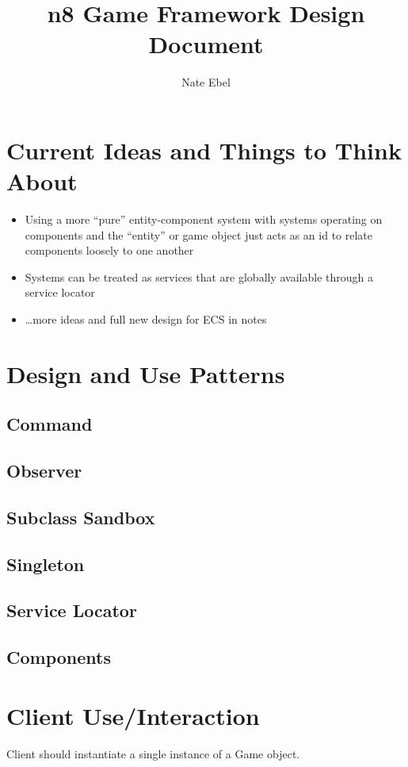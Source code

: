 \documentclass[12pt]{article}
\begin{document}
\title{n8 Game Framework Design Document}
\author{Nate Ebel}

\maketitle

\tableofcontents
\pagebreak

\section{Current Ideas and Things to Think About}
\begin{itemize}
	\item Using a more ``pure'' entity-component system with systems operating on components and the ``entity'' or game object just acts as an id to relate components loosely to one another
	\item Systems can be treated as services that are globally available through a service locator
	\item \dots more ideas and full new design for ECS in notes
\end{itemize}

\section{Design and Use Patterns}
\subsection{Command}
\subsection{Observer}
\subsection{Subclass Sandbox}
\subsection{Singleton}
\subsection{Service Locator}
\subsection{Components}

\section{Client Use/Interaction}
Client should instantiate a single instance of a Game object.  
\end{document}
